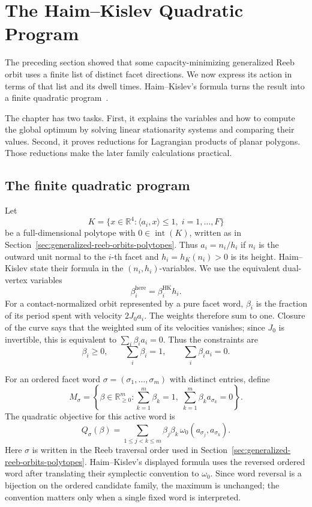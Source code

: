 \section{The Haim--Kislev Quadratic Program}
\label{sec:quadratic-program-algorithm-hk2019}

The preceding section showed that some capacity-minimizing generalized
Reeb orbit uses a finite list of distinct facet directions. We now express
its action in terms of that list and its dwell times. Haim--Kislev's
formula turns the result into a finite quadratic program~\cite{HK2017}.

The chapter has two tasks. First, it explains the variables and how to
compute the global optimum by solving linear stationarity systems and
comparing their values. Second, it proves reductions for Lagrangian
products of planar polygons. Those reductions make the later family
calculations practical.

\subsection{The finite quadratic program}
\label{subsec:quadratic-program-algorithm-hk2019-general-polytopes}

Let
\[
  K=\{x\in\mathbb{R}^4:\langle a_i,x\rangle\leq 1,\;
    i=1,\ldots,F\}
\]
be a full-dimensional polytope with \(0\in\operatorname{int}(K)\), written as
in Section~\ref{sec:generalized-reeb-orbits-polytopes}. Thus
\(a_i=n_i/h_i\) if \(n_i\) is the outward unit normal to the \(i\)-th facet and
\(h_i=h_K(n_i)>0\) is its height. Haim--Kislev state their formula in the
\((n_i,h_i)\)-variables. We use the equivalent dual-vertex variables
\[
  \beta_i^{\mathrm{here}}=\beta_i^{\mathrm{HK}}h_i.
\]
For a contact-normalized orbit represented by a pure facet word,
$\beta_i$ is the fraction of its period spent
with velocity $2J_0a_i$. The weights therefore sum to one. Closure of the
curve says that the weighted sum of its velocities vanishes; since $J_0$
is invertible, this is equivalent to $\sum_i\beta_i a_i=0$.
Thus the constraints are
\[
  \beta_i\geq0,\qquad
  \sum_i\beta_i=1,\qquad
  \sum_i\beta_i a_i=0.
\]

For an ordered facet word
\(\sigma=(\sigma_1,\ldots,\sigma_m)\) with distinct entries, define
\[
  M_\sigma
  =
  \left\{
    \beta\in\mathbb{R}_{\geq0}^m:
    \sum_{k=1}^m\beta_k=1,\;
    \sum_{k=1}^m\beta_k a_{\sigma_k}=0
  \right\}.
\]
The quadratic objective for this active word is
\begin{equation}\label{eq:quadratic-program-algorithm-hk2019-q}
  Q_\sigma(\beta)
  =
  \sum_{1\leq j<k\leq m}
    \beta_j\beta_k\,\omega_0(a_{\sigma_j},a_{\sigma_k}).
\end{equation}
Here \(\sigma\) is written in the Reeb traversal order used in
Section~\ref{sec:generalized-reeb-orbits-polytopes}. Haim--Kislev's displayed
formula uses the reversed ordered word after translating their symplectic
convention to \(\omega_0\). Since word reversal is a bijection on the ordered
candidate family, the maximum is unchanged; the convention matters only when a
single fixed word is interpreted.

